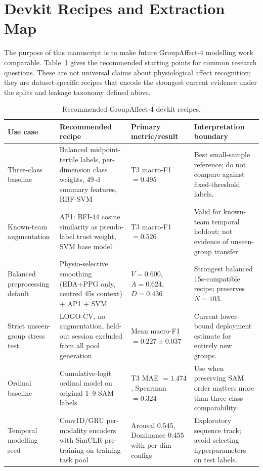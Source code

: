 \documentclass[sigconf,review,anonymous]{acmart}
\begin{document}
\section{Devkit Recipes and Extraction Map}
\label{sec:devkit_recipes}

The purpose of this manuscript is to make future GroupAffect-4 modelling work
comparable.
Table~\ref{tab:recipes} gives the recommended starting points for common
research questions.
These are not universal claims about physiological affect recognition; they
are dataset-specific recipes that encode the strongest current evidence under
the splits and leakage taxonomy defined above.

\begin{table}[t]
\caption{Recommended GroupAffect-4 devkit recipes.}
\label{tab:recipes}
\centering
\setlength{\tabcolsep}{4pt}
\small
\begin{tabular}{p{}p{}p{}p{}}
\toprule
\textbf{Use case} & \textbf{Recommended recipe} & \textbf{Primary metric/result} &
\textbf{Interpretation boundary} \\
\midrule
Three-class baseline &
Balanced midpoint-tertile labels, per-dimension class weights, 49-d summary
features, RBF-SVM &
T3 macro-F1 $=0.495$ &
Best small-sample reference; do not compare against fixed-threshold labels. \\
\addlinespace
Known-team augmentation &
AP1: BFI-44 cosine similarity as pseudo-label trust weight, SVM base model &
T3 macro-F1 $=0.526$ &
Valid for known-team temporal holdout; not evidence of unseen-group transfer. \\
\addlinespace
Balanced preprocessing default &
Physio-selective smoothing (EDA+PPG only, centred 45s context) + AP1 + SVM &
$V{=}0.600$, $A{=}0.624$, $D{=}0.436$ &
Strongest balanced 15s-compatible recipe; preserves $N{=}103$. \\
\addlinespace
Strict unseen-group stress test &
LOGO-CV, no augmentation, held-out session excluded from all pool generation &
Mean macro-F1 $=0.227\pm0.037$ &
Current lower-bound deployment estimate for entirely new groups. \\
\addlinespace
Ordinal baseline &
Cumulative-logit ordinal model on original 1--9 SAM labels &
T3 MAE $=1.474$, Spearman $=0.324$ &
Use when preserving SAM order matters more than three-class comparability. \\
\addlinespace
Temporal modelling seed &
Conv1D/GRU per-modality encoders with SimCLR pre-training on training-task pool &
Arousal $0.545$, Dominance $0.455$ with per-dim configs &
Exploratory sequence track; avoid selecting hyperparameters on test labels. \\
\bottomrule
\end{tabular}
\end{table}
\end{document}
